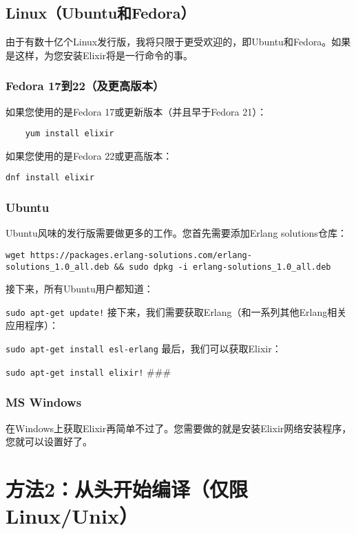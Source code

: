 \subsection{Linux（Ubuntu和Fedora）}

由于有数十亿个Linux发行版，我将只限于更受欢迎的，即Ubuntu和Fedora。如果是这样，为您安装Elixir将是一行命令的事。

\subsubsection{Fedora 17到22（及更高版本）}

如果您使用的是Fedora 17或更新版本（并且早于Fedora 21）：

\begin{code}{}
\begin{verbatim}
    yum install elixir
\end{verbatim}
\end{code}

如果您使用的是Fedora 22或更高版本：

\texttt{dnf install elixir}

\subsubsection{Ubuntu}

Ubuntu风味的发行版需要做更多的工作。您首先需要添加Erlang solutions仓库：

\texttt{wget https://packages.erlang-solutions.com/erlang-solutions\_1.0\_all.deb \&\& sudo dpkg -i erlang-solutions\_1.0\_all.deb}

接下来，所有Ubuntu用户都知道：

\texttt{sudo apt-get update!}
接下来，我们需要获取Erlang（和一系列其他Erlang相关应用程序）：

\texttt{sudo apt-get install esl-erlang}
最后，我们可以获取Elixir：

\texttt{sudo apt-get install elixir!} \#\#\# 

\subsubsection{MS Windows}

在Windows上获取Elixir再简单不过了。您需要做的就是安装Elixir网络安装程序，您就可以设置好了。


\section{方法2：从头开始编译（仅限Linux/Unix）}

